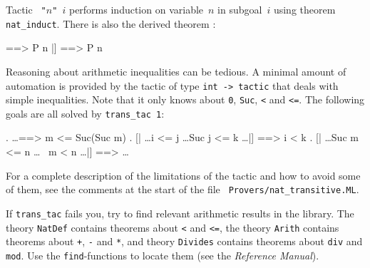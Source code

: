 
Tactic {\tt{} "$n$" $i$} performs induction on variable~$n$
in subgoal~$i$ using theorem \texttt{nat_induct}.  There is also the derived
theorem :
\begin{ttbox}
[| !!n. [| ! m. m<n --> P m |] ==> P n |]  ==>  P n
\end{ttbox}


Reasoning about arithmetic inequalities can be tedious.  A minimal amount of
automation is provided by the tactic  of type \texttt{int ->
tactic} that deals with simple inequalities.  Note that it only knows about
{\tt 0}, \texttt{Suc}, {\tt<} and {\tt<=}.  The following goals are all solved by
{\tt trans_tac 1}:
\begin{ttbox}
{. \dots ==> m <= Suc(Suc m)}
{. [| \dots i <= j \dots Suc j <= k \dots |] ==> i < k}
{. [| \dots Suc m <= n \dots ~ m < n \dots |] ==> \dots}
\end{ttbox}
For a complete description of the limitations of the tactic and how to avoid
some of them, see the comments at the start of the file {\tt
Provers/nat_transitive.ML}.

If \texttt{trans_tac} fails you, try to find relevant arithmetic results in
the library.  The theory \texttt{NatDef} contains theorems about {\tt<} and
{\tt<=}, the theory \texttt{Arith} contains theorems about \texttt{+},
\texttt{-} and \texttt{*}, and theory \texttt{Divides} contains theorems about
\texttt{div} and \texttt{mod}.  Use the \texttt{find}-functions to locate them
(see the {\em Reference Manual\/}).

